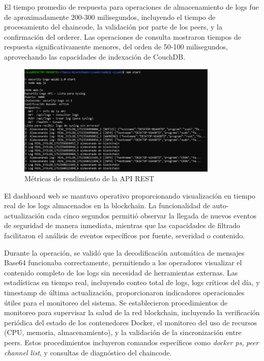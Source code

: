 El tiempo promedio de respuesta para operaciones de almacenamiento de logs fue de aproximadamente 200-300 milisegundos, incluyendo el tiempo de procesamiento del chaincode, la validación por parte de los peers, y la confirmación del orderer. Las operaciones de consulta mostraron tiempos de respuesta significativamente menores, del orden de 50-100 milisegundos, aprovechando las capacidades de indexación de CouchDB.
\begin{figure}[H]
\centering
\includegraphics[width=0.85\textwidth]{figuras/rendimiento_api.png}
\caption{Métricas de rendimiento de la API REST}
\label{fig:rendimiento-api}
\end{figure}
El dashboard web se mantuvo operativo proporcionando visualización en tiempo real de los logs almacenados en la blockchain. La funcionalidad de auto-actualización cada cinco segundos permitió observar la llegada de nuevos eventos de seguridad de manera inmediata, mientras que las capacidades de filtrado facilitaron el análisis de eventos específicos por fuente, severidad o contenido.

Durante la operación, se validó que la decodificación automática de mensajes Base64 funcionaba correctamente, permitiendo a los operadores visualizar el contenido completo de los logs sin necesidad de herramientas externas. Las estadísticas en tiempo real, incluyendo conteo total de logs, logs críticos del día, y timestamp de última actualización, proporcionaron indicadores operacionales útiles para el monitoreo del sistema.
Se establecieron procedimientos de monitoreo para supervisar la salud de la red blockchain, incluyendo la verificación periódica del estado de los contenedores Docker, el monitoreo del uso de recursos (CPU, memoria, almacenamiento), y la validación de la sincronización entre peers. Estos procedimientos incluyeron comandos específicos como \textit{docker ps}, \textit{peer channel list}, y consultas de diagnóstico del chaincode.

